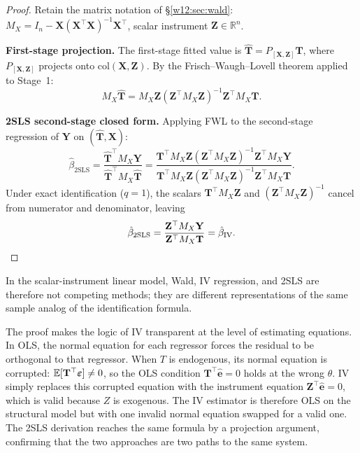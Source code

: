 \documentclass[master.tex]{subfiles}
\begin{document}
\begin{proof}
Retain the matrix notation of \S\ref{w12:sec:wald}: $M_X =
I_n - \mathbf{X}(\mathbf{X}^\top\mathbf{X})^{-1}\mathbf{X}^\top$,
scalar instrument $\mathbf{Z} \in \mathbb{R}^n$.

\textbf{First-stage projection.}
The first-stage fitted value is $\hat{\mathbf{T}} =
P_{[\mathbf{X},\mathbf{Z}]}\mathbf{T}$, where
$P_{[\mathbf{X},\mathbf{Z}]}$ projects onto
$\mathrm{col}(\mathbf{X}, \mathbf{Z})$.  By the
Frisch--Waugh--Lovell theorem applied to Stage~1:
\[
  M_X\hat{\mathbf{T}}
  = M_X\mathbf{Z}
    (\mathbf{Z}^\top M_X\mathbf{Z})^{-1}
    \mathbf{Z}^\top M_X\mathbf{T}.
\]

\textbf{2SLS second-stage closed form.}
Applying FWL to the second-stage regression of $\mathbf{Y}$ on
$(\hat{\mathbf{T}}, \mathbf{X})$:
\[
  \hat\beta_{\mathrm{2SLS}}
  = \frac{\hat{\mathbf{T}}^\top M_X \mathbf{Y}}
         {\hat{\mathbf{T}}^\top M_X \hat{\mathbf{T}}}
  = \frac{\mathbf{T}^\top M_X\mathbf{Z}
          (\mathbf{Z}^\top M_X\mathbf{Z})^{-1}
          \mathbf{Z}^\top M_X\mathbf{Y}}
         {\mathbf{T}^\top M_X\mathbf{Z}
          (\mathbf{Z}^\top M_X\mathbf{Z})^{-1}
          \mathbf{Z}^\top M_X\mathbf{T}}.
\]
Under exact identification ($q = 1$), the scalars
$\mathbf{T}^\top M_X\mathbf{Z}$ and
$(\mathbf{Z}^\top M_X\mathbf{Z})^{-1}$ cancel from numerator and
denominator, leaving
\[
  \hat\beta_{\mathrm{2SLS}}
  = \frac{\mathbf{Z}^\top M_X\mathbf{Y}}
         {\mathbf{Z}^\top M_X\mathbf{T}}
  = \hat\beta_{\mathrm{IV}}. \qedhere
\]
\end{proof}

In the scalar-instrument linear model, Wald, IV regression, and 2SLS
are therefore not competing methods; they are different representations
of the same sample analog of the identification formula.

\begin{remark}
The proof makes the logic of IV transparent at the level of estimating
equations.  In OLS, the normal equation for each regressor forces the
residual to be orthogonal to that regressor.  When $T$ is endogenous,
its normal equation is corrupted: $\mathbb{E}[\mathbf{T}^\top\boldsymbol\varepsilon]
\neq 0$, so the OLS condition $\mathbf{T}^\top\hat{\mathbf{e}} = 0$
holds at the wrong $\theta$.  IV simply replaces this corrupted equation
with the instrument equation $\mathbf{Z}^\top\hat{\mathbf{e}} = 0$,
which is valid because $Z$ is exogenous.  The IV estimator is
therefore OLS on the structural model but with one invalid normal
equation swapped for a valid one.  The 2SLS derivation reaches the
same formula by a projection argument, confirming that the two
approaches are two paths to the same system.
\end{remark}
\end{document}
